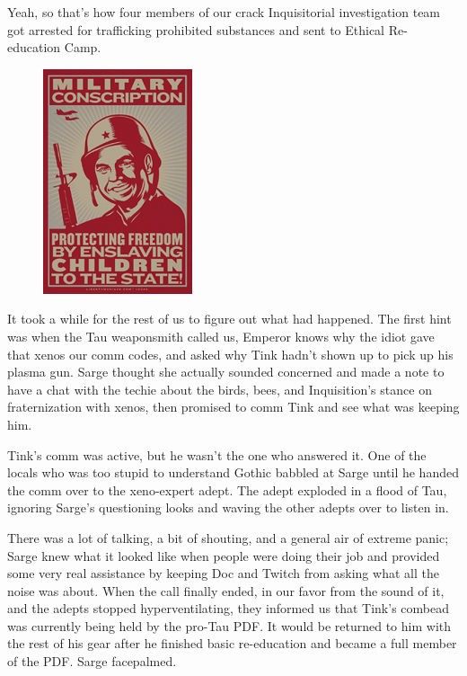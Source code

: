 Yeah, so that's how four members of our crack Inquisitorial investigation team got arrested for trafficking prohibited substances and sent to Ethical Re-education Camp.

\begin{figure}
	\begin{center}
		\includegraphics[width=\figwidth]{pics/10/41.png}
	\end{center}
\end{figure}
It took a while for the rest of us to figure out what had happened. 
The first hint was when the Tau weaponsmith called us, Emperor knows why the idiot gave that xenos our comm codes, and asked why Tink hadn't shown up to pick up his plasma gun. 
Sarge thought she actually sounded concerned and made a note to have a chat with the techie about the birds, bees, and Inquisition's stance on fraternization with xenos, then promised to comm Tink and see what was keeping him.

Tink's comm was active, but he wasn't the one who answered it. 
One of the locals who was too stupid to understand Gothic babbled at Sarge until he handed the comm over to the xeno-expert adept. 
The adept exploded in a flood of Tau, ignoring Sarge's questioning looks and waving the other adepts over to listen in.

There was a lot of talking, a bit of shouting, and a general air of extreme panic; 
Sarge knew what it looked like when people were doing their job and provided some very real assistance by keeping Doc and Twitch from asking what all the noise was about. 
When the call finally ended, in our favor from the sound of it, and the adepts stopped hyperventilating, they informed us that Tink's combead was currently being held by the pro-Tau PDF. 
It would be returned to him with the rest of his gear after he finished basic re-education and became a full member of the PDF. 
Sarge facepalmed.

